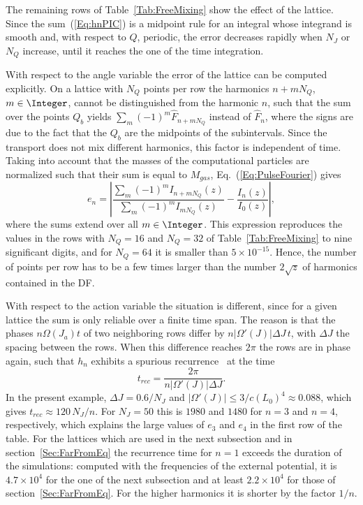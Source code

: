 The remaining rows of Table~\ref{Tab:FreeMixing} show the effect of the lattice. Since the sum~(\ref{Eq:hnPIC}) is a midpoint rule for an integral whose integrand is smooth and, with respect to $Q$, periodic, the error decreases rapidly when $N_J$ or $N_Q$ increase, until it reaches the one of the time integration.

With respect to the angle variable the error of the lattice can be computed explicitly. On a lattice with $N_Q$ points per row the harmonics $n + mN_Q$, $m\in\Integer$, cannot be distinguished from the harmonic $n$, such that the sum over the points $Q_b$ yields $\sum_m (-1)^m\hat{F}_{n+mN_Q}$ instead of $\hat{F}_n$, where the signs are due to the fact that the $Q_b$ are the midpoints of the subintervals. Since the transport does not mix different harmonics, this factor is independent of time. Taking into account that the masses of the computational particles are normalized such that their sum is equal to $M_{gas}$, Eq.~(\ref{Eq:PulseFourier}) gives
\begin{equation}
e_n = \left| \frac{\sum_m (-1)^m I_{n+mN_Q}(z)}{\sum_m (-1)^m I_{mN_Q}(z)} - \frac{I_n(z)}{I_0(z)} \right| ,
\label{Eq:Aliasing}
\end{equation}
where the sums extend over all $m\in\Integer$. This expression reproduces the values in the rows with $N_Q = 16$ and $N_Q = 32$ of Table~\ref{Tab:FreeMixing} to nine significant digits, and for $N_Q = 64$ it is smaller than $5\times 10^{-15}$. Hence, the number of points per row has to be a few times larger than the number $2\sqrt{z}$ of harmonics contained in the DF.

With respect to the action variable the situation is different, since for a given lattice the sum is only reliable over a finite time span. The reason is that the phases $n\Omega(J_a)t$ of two neighboring rows differ by $n|\Omega'(J)|\Delta J\, t$, with $\Delta J$ the spacing between the rows. When this difference reaches $2\pi$ the rows are in phase again, such that $h_n$ exhibits a spurious recurrence~\cite{BirdsallLangdon-Book} at the time
\begin{equation}
t_{rec} = \frac{2\pi}{n|\Omega'(J)|\Delta J}.
\label{Eq:Recurrence}
\end{equation}
In the present example, $\Delta J = 0.6/N_J$ and $|\Omega'(J)|\leq 3/c(L_0)^4\approx 0.088$, which gives $t_{rec}\approx 120\, N_J/n$. For $N_J = 50$ this is $1980$ and $1480$ for $n = 3$ and $n = 4$, respectively, which explains the large values of $e_3$ and $e_4$ in the first row of the table. For the lattices which are used in the next subsection and in section~\ref{Sec:FarFromEq} the recurrence time for $n = 1$ exceeds the duration of the simulations: computed with the frequencies of the external potential, it is $4.7\times 10^4$ for the one of the next subsection and at least $2.2\times 10^4$ for those of section~\ref{Sec:FarFromEq}. For the higher harmonics it is shorter by the factor $1/n$.

